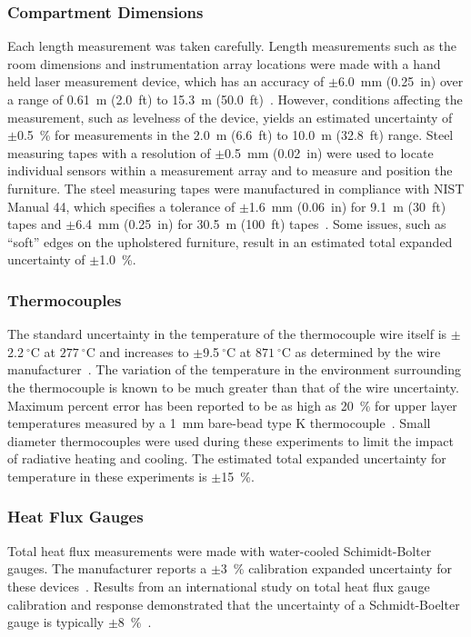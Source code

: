 \documentclass[12pt,oneside]{book}
\begin{document}
\subsubsection{Compartment Dimensions}
Each length measurement was taken carefully. Length measurements such as the room dimensions and instrumentation array locations were made with a hand held laser measurement device, which has an accuracy of $\pm$6.0~mm (0.25~in) over a range of 0.61~m (2.0~ft) to 15.3~m (50.0~ft)~\cite{StanleyTools}. However, conditions affecting the measurement, such as levelness of the device, yields an estimated uncertainty of $\pm$0.5~\% for measurements in the 2.0~m (6.6~ft) to 10.0~m (32.8~ft) range. Steel measuring tapes with a resolution of $\pm$0.5~mm (0.02~in) were used to locate individual sensors within a measurement array and to measure and position the furniture. The steel measuring tapes were manufactured in compliance with NIST Manual 44, which specifies a tolerance of $\pm$1.6~mm (0.06~in) for 9.1~m (30~ft) tapes and $\pm$6.4~mm (0.25~in) for 30.5~m (100~ft) tapes~\cite{Butcher:2012}. Some issues, such as ``soft'' edges on the upholstered furniture, result in an estimated total expanded uncertainty of $\pm$1.0~\%.

\subsubsection{Thermocouples}
The standard uncertainty in the temperature of the thermocouple wire itself is $\pm$2.2$~^{\circ}$C at $277~^{\circ}$C and increases to $\pm$9.5$~^{\circ}$C at $871~^{\circ}$C as determined by the wire manufacturer~\cite{Omega:2004}. The variation of the temperature in the environment surrounding the thermocouple is known to be much greater than that of the wire uncertainty. Maximum percent error has been reported to be as high as 20~\% for upper layer temperatures measured by a 1~mm bare-bead type K thermocouple~\cite{Blevins:1999,Pitts:2003}. Small diameter thermocouples were used during these experiments to limit the impact of radiative heating and cooling. The estimated total expanded uncertainty for temperature in these experiments is $\pm$15~\%.

\subsubsection{Heat Flux Gauges}
Total heat flux measurements were made with water-cooled Schimidt-Bolter gauges. The manufacturer reports a $\pm$3~\% calibration expanded uncertainty for these devices~\cite{Medtherm:2003}. Results from an international study on total heat flux gauge calibration and response demonstrated that the uncertainty of a Schmidt-Boelter gauge is typically $\pm$8~\%~\cite{Pitts:2006}.
\end{document}
